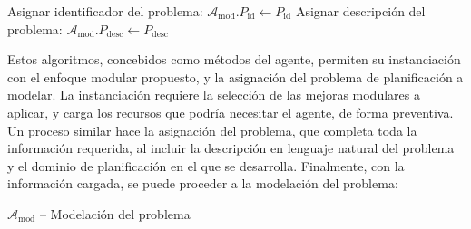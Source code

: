 \begin{anexes}
\begin{algorithm}[H]
Asignar identificador del problema: \(\mathcal{A}_{\mathrm{mod}}.P_{\mathrm{id}} \leftarrow P_{\mathrm{id}}\)\;
Asignar descripción del problema: \(\mathcal{A}_{\mathrm{mod}}.P_{\mathrm{desc}} \leftarrow P_{\mathrm{desc}}\)\;

\end{algorithm}

Estos algoritmos, concebidos como métodos del agente, permiten su instanciación con el enfoque modular propuesto, y la asignación del problema de planificación a modelar. La instanciación requiere la selección de las mejoras modulares a aplicar, y carga los recursos que podría necesitar el agente, de forma preventiva. Un proceso similar hace la asignación del problema, que completa toda la información requerida, al incluir la descripción en lenguaje natural del problema y el dominio de planificación en el que se desarrolla. Finalmente, con la información cargada, se puede proceder a la modelación del problema:

\begin{algorithm}[H]
\caption{\(\mathcal{A}_{\text{mod}}\) -- Modelación del problema}
\label{alg:resolucion-problema}


\Else{
	 \(\tau \leftarrow \emptyset\)\;
}


\end{algorithm}
\end{anexes}
